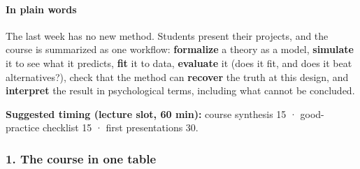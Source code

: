 \paragraph{In plain words}

The last week has no new method. Students present their projects, and
the course is summarized as one workflow: \textbf{formalize} a theory as
a model, \textbf{simulate} it to see what it predicts, \textbf{fit} it
to data, \textbf{evaluate} it (does it fit, and does it beat
alternatives?), check that the method can \textbf{recover} the truth at
this design, and \textbf{interpret} the result in psychological terms,
including what cannot be concluded.

\textbf{Suggested timing (lecture slot, 60 min):} course synthesis 15 ·
good-practice checklist 15 · first presentations 30.

\subsubsection{1. The course in one table}

